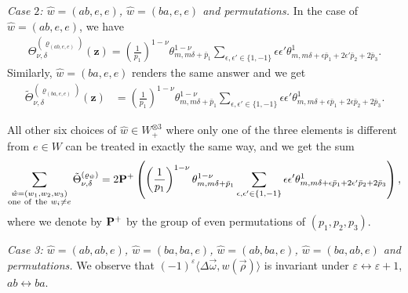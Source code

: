 \documentclass[10pt,a4paper]{amsart}
\def\bos{\varrho}
\theoremstyle{definition}
\numberwithin{equation}{section}
\begin{document}
{\em Case $2$: $\hat w=(ab,e,e)$, $\hat w=(ba,e,e)$ and permutations.}
In the case of $\hat w=(ab,e,e)$, we have
\begin{gather*}
 \Theta_{\nu,\delta}^{(\bos_{(ab,e,e)})}(\mathbf{z}) =\left(\frac{1}{p_1}\right)^{1-\nu} \theta^{1-\nu}_{m,m\delta+\bar{p}_1}
 \sum_{\epsilon,\epsilon'\in \{1,-1\}} \epsilon \epsilon' \theta^1_{m,m\delta + \epsilon{\bar p_1}+ 2\epsilon'{\bar p_2}+2{\bar p_3}} .
\end{gather*}
Similarly, $\hat w=(ba,e,e)$ renders the same answer and we get
\begin{align*}
 \tilde\Theta_{\nu,\delta}^{(\bos_{(ba,e,e)})}(\mathbf{z})
&= \left(\frac{1}{p_1}\right)^{1-\nu}
 \theta^{1-\nu}_{m,m\delta+\bar p_1} \sum_{\epsilon,\epsilon'\in \{1,-1\}} \epsilon \epsilon' \theta^1_{m,m\delta + \epsilon\bar p_1+ 2\epsilon \bar p_2+ 2 \bar p_3} .
\end{align*}

All other six choices of $\hat w\in W_+^{\otimes 3}$ where only one of the three elements is different from $e\in W$ can be treated in exactly the same way, and we get the sum
\begin{gather*}\label{intro-PplusEvPerm}
\sum_{\substack{\hat w=(w_1,w_2,w_3)\\{\rm{one~of~the~}}w_i \neq e }} \tilde\Theta_{\nu,\delta}^{(\bos_{\hat w})}
 = 2 {\bf P}^+ \left(\left(\frac{1}{p_1}\right)^{1-\nu}
 \theta^{1-\nu}_{m,m\delta+\bar p_1} \sum_{\epsilon,\epsilon'\in \{1,-1\}} \epsilon\epsilon' \theta^1_{m,m\delta +\epsilon \bar p_1+ 2 \epsilon' \bar p_2+ 2\bar p_3 }\right),
\end{gather*}
where we denote by ${\bf P}^+$ by the group of even permutations of $(p_1,p_2,p_3)$.

{\em Case 3: $\hat w=(ab,ab,e)$, $\hat w=(ba,ba,e)$, $\hat w=(ab,ba,e)$, $\hat w=(ba,ab,e)$ and permutations.}
We observe that $(-1)^{\varepsilon} \langle \Delta\vec\omega, w(\vec{\rho}) \rangle$ is invariant under $\varepsilon\leftrightarrow \varepsilon+1$, $ab\leftrightarrow ba$.
\end{document}
